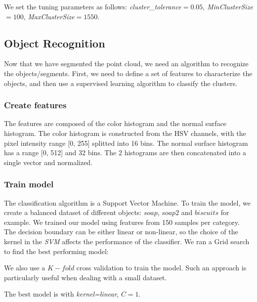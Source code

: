 \documentclass[a4paper,12pt]{report}
\begin{document}
\linespread{1.3}


We set the tuning parameters as follows: \textit{cluster\_tolerance}$=0.05$, \textit{MinClusterSize}$=100$, \textit{MaxClusterSize}$=1550$.

\subsection{Object Recognition}
Now that we have segmented the point cloud, we need an algorithm to recognize the objects/segments. First, we need to define a set of features to characterize the objects, and then use a supervised learning algorithm to classify the clusters.

\subsubsection{Create features}
The features are composed of the color histogram and the normal surface histogram. The color histogram is constructed from the HSV channels, with the pixel intensity range [0, 255] splitted into 16 bins. The normal surface histogram has a range [0, 512] and 32 bins. The 2 histograms are then concatenated into a single vector and normalized.

\linespread{1.3}



\subsubsection{Train model}
The classification algorithm is a Support Vector Machine. To train the model, we create a balanced dataset of different objects: $soap$, $soap2$ and $biscuits$ for example. We trained our model using features from 150 samples per category. The decision boundary can be either linear or non-linear, so the choice of the kernel in the \textit{SVM} affects the performance of the classifier. 
We ran a Grid search to find the best performing model:

\linespread{1.3}


We also use a $K-fold$ cross validation to train the model. Such an approach is particularly useful when dealing with a small dataset. 

The best model is with \textit{kernel=linear}, $C=1$. 
\end{document}

